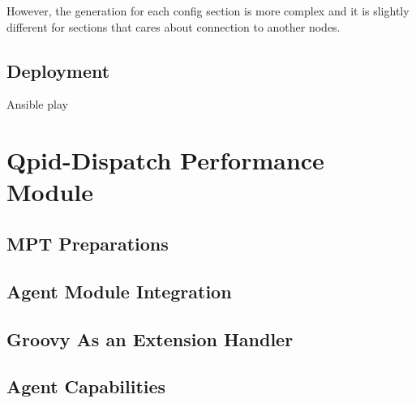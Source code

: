 
However, the generation for each config section is more complex and it is slightly different for sections that cares about connection to another nodes.

\subsection{Deployment}
Ansible play

\section{Qpid-Dispatch Performance Module}

\subsection{MPT Preparations}
\label{MPT Preparations}

\subsection{Agent Module Integration}

\subsection{Groovy As an Extension Handler}

\subsection{Agent Capabilities}
